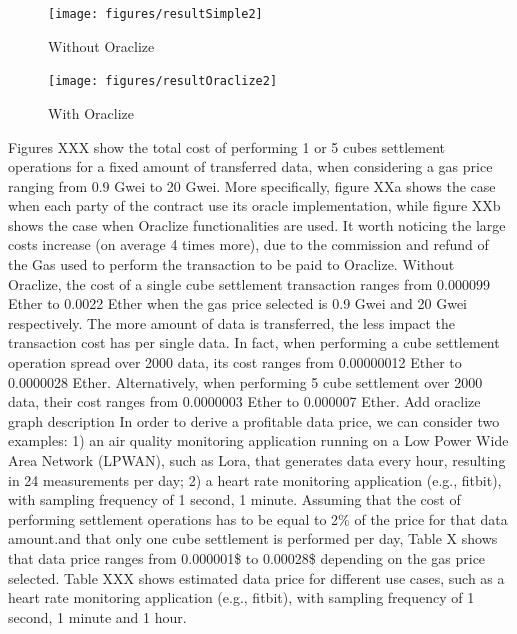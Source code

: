 \documentclass[chi_draft]{sigchi}
\begin{document}
\begin{figure}
	\centering
	\texttt{[image: figures/resultSimple2]}
	\caption{Without Oraclize}
	\label{fig:noOraclize}
\end{figure}

\begin{figure}
	\centering
	\texttt{[image: figures/resultOraclize2]}
	\caption{With Oraclize}
	\label{fig:withOraclize}
\end{figure}

Figures XXX show the total cost of performing 1 or 5 cubes settlement operations for a fixed amount of transferred data, when considering a gas price ranging from 0.9 Gwei to 20 Gwei.
More specifically, figure XXa shows the case when each party of the contract use its oracle implementation, while figure XXb shows the case when Oraclize functionalities are used. 
It worth noticing the large costs increase (on average 4 times more), due to the commission and refund of the Gas used to perform the transaction to be paid to Oraclize. 
Without Oraclize, the cost of a single cube settlement transaction ranges from 0.000099 Ether to 0.0022 Ether when the gas price selected is 0.9 Gwei and 20 Gwei respectively. The more amount of data is transferred, the less impact the transaction cost has per single data. In fact, when performing a cube settlement operation spread over 2000 data, its cost ranges from 0.00000012 Ether to 0.0000028 Ether. Alternatively, when performing 5 cube settlement over 2000 data, their cost ranges from 0.0000003 Ether to 0.000007 Ether.
Add oraclize graph description
In order to derive a profitable data price, we can consider two examples: 1) an air quality monitoring application running on a Low Power Wide Area Network (LPWAN), such as Lora, that generates data every hour, resulting in 24 measurements per day; 2) a heart rate monitoring application (e.g., fitbit), with sampling frequency of 1 second, 1 minute.  
Assuming that the cost of performing settlement operations has to be equal to 2\% of the price for that data amount.and that only one cube settlement is performed per day, Table X shows that data price ranges from 0.000001\$ to 0.00028\$ depending on the gas price selected. 
Table XXX shows estimated data price for different use cases, such as a heart rate monitoring application (e.g., fitbit), with sampling frequency of 1 second, 1 minute and 1 hour.   
\end{document}
